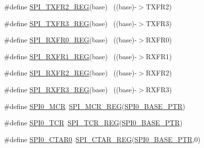 \begin{DoxyCompactItemize}
\item 
\#define \hyperlink{group___s_p_i___register___accessor___macros_ga54c1e67e69fb1a8b1baef7a520df5e39}{S\+P\+I\+\_\+\+T\+X\+F\+R2\+\_\+\+R\+EG}(base)                                        ~((base)-\/$>$T\+X\+F\+R2)
\item 
\#define \hyperlink{group___s_p_i___register___accessor___macros_gac353c1ece16b5024b887c728cbe32d34}{S\+P\+I\+\_\+\+T\+X\+F\+R3\+\_\+\+R\+EG}(base)                                        ~((base)-\/$>$T\+X\+F\+R3)
\item 
\#define \hyperlink{group___s_p_i___register___accessor___macros_ga0f6e212d734b440c0b7e16d3389a6687}{S\+P\+I\+\_\+\+R\+X\+F\+R0\+\_\+\+R\+EG}(base)                                        ~((base)-\/$>$R\+X\+F\+R0)
\item 
\#define \hyperlink{group___s_p_i___register___accessor___macros_gacf895cbc35557f8f25eff12d7e84d582}{S\+P\+I\+\_\+\+R\+X\+F\+R1\+\_\+\+R\+EG}(base)                                        ~((base)-\/$>$R\+X\+F\+R1)
\item 
\#define \hyperlink{group___s_p_i___register___accessor___macros_ga23c02a896d81445dbdea2e8d0d490b0a}{S\+P\+I\+\_\+\+R\+X\+F\+R2\+\_\+\+R\+EG}(base)                                        ~((base)-\/$>$R\+X\+F\+R2)
\item 
\#define \hyperlink{group___s_p_i___register___accessor___macros_ga2419cd7143d831f0a31ac7bda0da7af7}{S\+P\+I\+\_\+\+R\+X\+F\+R3\+\_\+\+R\+EG}(base)                                        ~((base)-\/$>$R\+X\+F\+R3)
\item 
\#define \hyperlink{group___s_p_i___register___accessor___macros_gaad4d9e80de527e18ba0e9d5d2bb296f1}{S\+P\+I0\+\_\+\+M\+CR}~\hyperlink{group___s_p_i___register___accessor___macros_gae54fdee07e5ec098efe6da63f34f2ecd}{S\+P\+I\+\_\+\+M\+C\+R\+\_\+\+R\+EG}(\hyperlink{group___s_p_i___peripheral_ga851f64a97b5919c1f99a34db5918b3b4}{S\+P\+I0\+\_\+\+B\+A\+S\+E\+\_\+\+P\+TR})
\item 
\#define \hyperlink{group___s_p_i___register___accessor___macros_ga210fb00eb7662406b9ecf9d26d6b59b7}{S\+P\+I0\+\_\+\+T\+CR}~\hyperlink{group___s_p_i___register___accessor___macros_gac7b659989db7f592b223186299d8535e}{S\+P\+I\+\_\+\+T\+C\+R\+\_\+\+R\+EG}(\hyperlink{group___s_p_i___peripheral_ga851f64a97b5919c1f99a34db5918b3b4}{S\+P\+I0\+\_\+\+B\+A\+S\+E\+\_\+\+P\+TR})
\item 
\#define \hyperlink{group___s_p_i___register___accessor___macros_ga361272e0b4388562e3b354b195055cf3}{S\+P\+I0\+\_\+\+C\+T\+A\+R0}~\hyperlink{group___s_p_i___register___accessor___macros_ga5ab762c9000b796d14c1ce822eefc436}{S\+P\+I\+\_\+\+C\+T\+A\+R\+\_\+\+R\+EG}(\hyperlink{group___s_p_i___peripheral_ga851f64a97b5919c1f99a34db5918b3b4}{S\+P\+I0\+\_\+\+B\+A\+S\+E\+\_\+\+P\+TR},0)

\end{DoxyCompactItemize}
